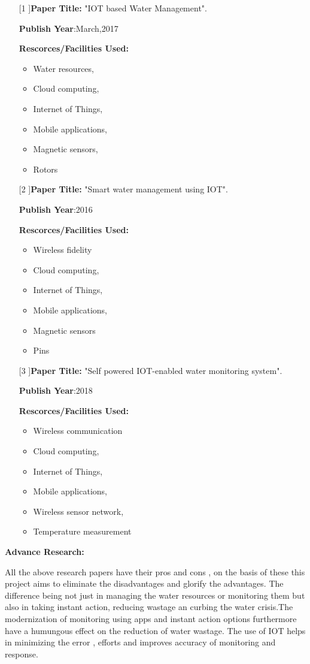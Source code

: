 \documentclass[12pt,times,a4paper]{report}
\begin{document}
{{\begin{normalsize}
\begin{itemize}
\item[[1]]\textbf{Paper Title:} "IOT based Water Management".
\par
\textbf{Publish Year}:March,2017
\par
\textbf{Rescorces/Facilities Used:}
\begin{itemize}
    \item 	Water resources,
	\item Cloud computing,
\item Internet of Things,
\item Mobile applications,
\item Magnetic sensors,
\item Rotors
\end{itemize}
\item[[2]]\textbf{Paper Title:} "Smart water management using IOT".
\par
\textbf{Publish Year}:2016
\par
\textbf{Rescorces/Facilities Used:}
\begin{itemize}
    \item Wireless fidelity
\item Cloud computing,
\item Internet of Things,
\item Mobile applications,
\item Magnetic sensors
\item Pins
\end{itemize}
\item[[3]]\textbf{Paper Title:} "Self powered IOT-enabled water monitoring system".
\par
\textbf{Publish Year}:2018
\par
\textbf{Rescorces/Facilities Used:}
\begin{itemize}
    \item 	Wireless communication
\item	Cloud computing,
\item	Internet of Things,
\item	Mobile applications,
\item	Wireless sensor network,
\item	Temperature measurement
\end{itemize}
\end{itemize}
\par
\textbf{Advance Research:}
\par
All the above research papers have their pros and cons , on the basis of these this project aims to eliminate the disadvantages and glorify the advantages. The difference being not just in managing the water resources or monitoring them but also in taking instant action, reducing wastage an curbing the water crisis.The modernization of monitoring using apps and instant action options furthermore have a humungous effect on the reduction of water wastage. The use of IOT helps in minimizing the error , efforts and improves accuracy of monitoring and response. 



\end{normalsize}}}
\end{document}
